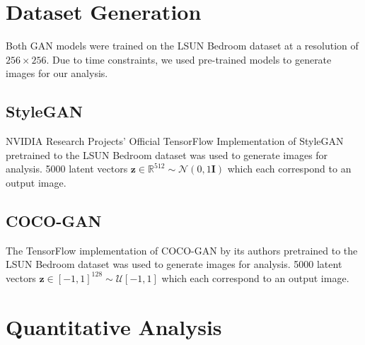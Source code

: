 \documentclass[10pt]{article}
\begin{document}
\begin{multicols*}{2}
        \section{Dataset Generation}
        \label{sec:dataset}
        Both GAN models were trained on the LSUN Bedroom dataset\cite{lsunBedroom} at a resolution of $256 \times 256$.
        Due to time constraints, we used pre-trained models to generate images for our analysis.

        \label{sec:datasetGeneration}
        \subsection{StyleGAN}
        \label{subsec:styleganGeneration}
        NVIDIA Research Projects' Official TensorFlow Implementation of StyleGAN pretrained to the LSUN Bedroom dataset\cite{styleGANCode} was used to generate images for analysis.
        5000 latent vectors $\mathbf{z} \in \mathbb{R}^{512} \sim \mathcal{N}(0, 1\mathbf{I})$ which each correspond to an output image.

        \subsection{COCO-GAN}
        \label{subsec:cocoganGeneration}
        The TensorFlow implementation of COCO-GAN by its authors pretrained to the LSUN Bedroom dataset\cite{cocogan} was used to generate images for analysis.
        5000 latent vectors $\mathbf{z} \in [-1, 1]^{128} \sim \mathcal{U}[-1, 1]$ which each correspond to an output image.

        \section{Quantitative Analysis}
        \label{sec:quantitative}

\end{multicols*}
\end{document}

